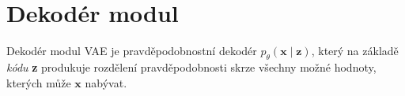 \section{Dekodér modul}
Dekodér modul VAE je pravděpodobnostní dekodér $p_\theta(\textbf{x}\mid\textbf{z})$,
který na základě \emph{kódu} \textbf{z} produkuje rozdělení pravděpodobnosti skrze všechny možné hodnoty, kterých může $\textbf{x}$ nabývat. \cite{Kingma2014}